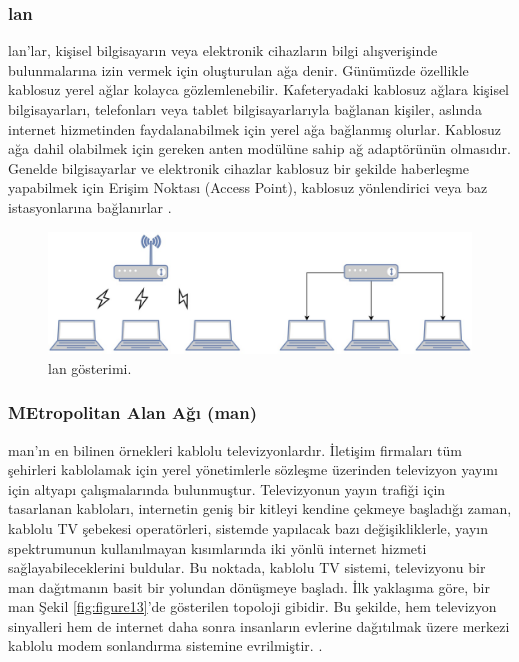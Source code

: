 \subsubsection{\gls{lan}}
\gls{lan}'lar, kişisel bilgisayarın veya elektronik cihazların bilgi alışverişinde bulunmalarına izin vermek için oluşturulan ağa denir. Günümüzde özellikle kablosuz yerel ağlar kolayca gözlemlenebilir. Kafeteryadaki kablosuz ağlara kişisel bilgisayarları, telefonları veya tablet bilgisayarlarıyla bağlanan kişiler, aslında internet hizmetinden faydalanabilmek için yerel ağa bağlanmış olurlar. Kablosuz ağa dahil olabilmek için gereken anten modülüne sahip ağ adaptörünün olmasıdır. Genelde bilgisayarlar ve elektronik cihazlar kablosuz bir şekilde haberleşme yapabilmek için Erişim Noktası (Access Point), kablosuz yönlendirici veya baz istasyonlarına bağlanırlar \cite{tanenbaum2002computer}.

\begin{figure}[htbp]
\centerline{\includegraphics[width=\columnwidth]{Resim/Sekil3-6.jpg}}
\caption{\gls{lan} gösterimi.}
\label{fig:figure12}
\end{figure}

\subsubsection{MEtropolitan Alan Ağı (\gls{man})}

\gls{man}'ın en bilinen örnekleri kablolu televizyonlardır. İletişim firmaları tüm şehirleri kablolamak için yerel yönetimlerle sözleşme üzerinden televizyon yayını için altyapı çalışmalarında bulunmuştur. Televizyonun yayın trafiği için tasarlanan kabloları, internetin geniş bir kitleyi kendine çekmeye başladığı zaman, kablolu TV şebekesi operatörleri, sistemde yapılacak bazı değişikliklerle, yayın spektrumunun kullanılmayan kısımlarında iki yönlü internet hizmeti sağlayabileceklerini buldular. Bu noktada, kablolu TV sistemi, televizyonu bir \gls{man} dağıtmanın basit bir yolundan dönüşmeye başladı. İlk yaklaşıma göre, bir \gls{man} Şekil \ref{fig:figure13}'de gösterilen topoloji gibidir. Bu şekilde, hem televizyon sinyalleri hem de internet daha sonra insanların evlerine dağıtılmak üzere merkezi kablolu modem sonlandırma sistemine evrilmiştir. \cite{tanenbaum2002computer}.


